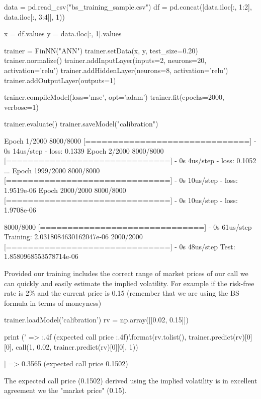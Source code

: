 \begin{ipython}
data = pd.read_csv("bs_training_sample.csv")
df = pd.concat([data.iloc[:, 1:2], data.iloc[:, 3:4]], 1))

x = df.values
y = data.iloc[:, 1].values

trainer = FinNN("ANN")
trainer.setData(x, y, test_size=0.20)
trainer.normalize()
trainer.addInputLayer(inputs=2, neurons=20, activation='relu')
trainer.addHiddenLayer(neurons=8, activation='relu')
trainer.addOutputLayer(outputs=1)

trainer.compileModel(loss='mse', opt='adam')
trainer.fit(epochs=2000, verbose=1)

trainer.evaluate()
trainer.saveModel("calibration")
\end{ipython}
\begin{ioutput}
Epoch 1/2000
8000/8000 [==============================] - 0s 14us/step - loss: 0.1339
Epoch 2/2000
8000/8000 [==============================] - 0s 4us/step - loss: 0.1052
...
Epoch 1999/2000
8000/8000 [==============================] - 0s 10us/step - loss: 1.9519e-06
Epoch 2000/2000
8000/8000 [==============================] - 0s 10us/step - loss: 1.9708e-06

8000/8000 [==============================] - 0s 61us/step
Training: 2.0318084630162047e-06
2000/2000 [==============================] - 0s 48us/step
Test: 1.8580968553578714e-06
\end{ioutput}

Provided our training includes the correct range of market prices of our
call we can quickly and easily estimate the implied volatility. For
example if the risk-free rate is 2\% and the current price is 0.15
(remember that we are using the BS formula in terms of moneyness)

\begin{ipython}
trainer.loadModel('calibration')
rv = np.array([[0.02, 0.15]])

print ('{} => {:.4f} (expected call price {:.4f})'.format(rv.tolist(),
                                                   trainer.predict(rv)[0][0],
                                                   call(1, 0.02, 
                                                   trainer.predict(rv)[0][0], 1))
\end{ipython}
\begin{ioutput}
[[0.02, 0.15]] => 0.3565 (expected call price 0.1502)
\end{ioutput}
\noindent
The expected call price (0.1502) derived using the implied volatility is in excellent agreement we the "market price" (0.15).

